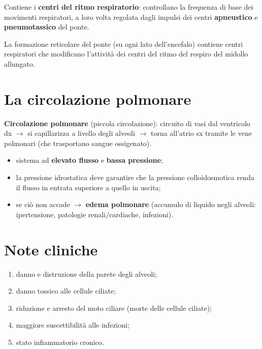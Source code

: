 Contiene i \textbf{centri del ritmo respiratorio}: controllano la frequenza di base dei movimenti
respiratori, a loro volta regolata dagli impulsi dei centri \textbf{apneustico} e
\textbf{pneumotassico} del ponte.

La formazione reticolare del ponte (su ogni lato dell'encefalo) contiene centri respiratori che
modificano l'attività dei centri del ritmo del respiro del midollo allungato.

\section{La circolazione polmonare}

\textbf{Circolazione polmonare} (piccola circolazione): circuito di vasi dal ventricolo dx
$\rightarrow$ si capillarizza a livello degli alveoli $\rightarrow$ torna all'atrio sx tramite le
vene polmonari (che trasportano sangue ossigenato).
\begin{itemize}
  \item sistema ad \textbf{elevato flusso} e \textbf{bassa pressione};
  \item la pressione idrostatica deve garantire che la pressione colloidosmotica renda il flusso in
    entrata superiore a quello in uscita;
  \item se ciò non accade $\rightarrow$ \textbf{edema polmonare} (accumulo di liquido negli alveoli:
    ipertensione, patologie renali/cardiache, infezioni).
\end{itemize}

\section{Note cliniche}

\begin{enumerate}
  \item danno e distruzione della parete degli alveoli;
  \item danno tossico alle cellule ciliate;
  \item riduzione e arresto del moto ciliare (morte delle cellule ciliate);
  \item maggiore suscettibilità alle infezioni;
  \item stato infiammatorio cronico.
\end{enumerate}

